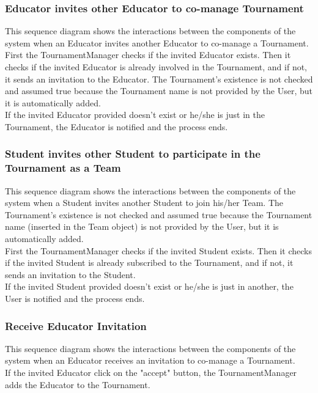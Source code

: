 \begin{landscape}
\clearpage
\subsubsection{Educator invites other Educator to co-manage Tournament} \label{sq:5}
This sequence diagram shows the interactions between the components of the system when an Educator invites another Educator to co-manage a Tournament.\\
First the TournamentManager checks if the invited Educator exists. Then it checks if the invited Educator is already involved in the Tournament, and if not, it sends an invitation to the Educator. The Tournament's existence is not
checked and assumed true because the Tournament name is not provided by the User, but it is automatically added.\\
If the invited Educator provided doesn't exist or he/she is just in the Tournament, the Educator is notified and the process ends.\\

\clearpage
\subsubsection{Student invites other Student to participate in the Tournament as a Team} \label{sq:6}
This sequence diagram shows the interactions between the components of the system when a Student invites another Student to join his/her Team. The Tournament's existence is not checked and assumed true because the Tournament name (inserted
in the Team object) is not provided by the User, but it is automatically added.\\
First the TournamentManager checks if the invited Student exists. Then it checks if the invited Student is already subscribed to the Tournament, and if not, it sends an invitation to the Student.\\
If the invited Student provided doesn't exist or he/she is just in another, the User is notified and the process ends.\\

\clearpage
\subsubsection{Receive Educator Invitation} \label{sq:7}
This sequence diagram shows the interactions between the components of the system when an Educator receives an invitation to co-manage a Tournament.\\
If the invited Educator click on the "accept" button, the TournamentManager adds the Educator to the Tournament.\\


\end{landscape}
